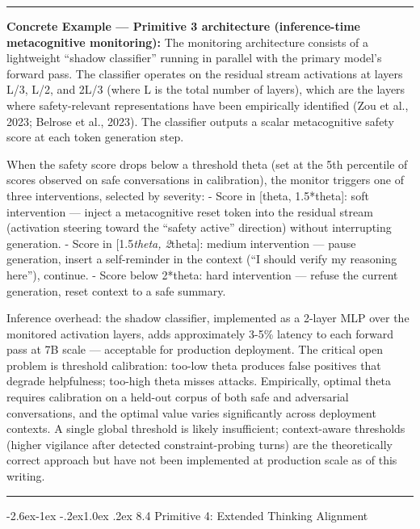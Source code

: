 \documentclass[
  11pt,
]{article}
\makeatletter
\renewcommand\subsection{\@startsection{subsection}{2}{\z@}%
  {-2.6ex\@plus -1ex \@minus -.2ex}{1.0ex \@plus .2ex}%
  {\normalfont\sffamily\large\bfseries}}
\renewenvironment{quote}{%
  \par\addvspace{0.7em}%
  \noindent\rule{\linewidth}{1.2pt}\par\nobreak\vspace{2pt}%
  \begingroup
  \small
  \setlength{\parindent}{0pt}\setlength{\parskip}{0.3em}%
  \setlength{\leftskip}{0.9em}\setlength{\rightskip}{0.4em}%
  \ignorespaces
}{%
  \par\endgroup\vspace{2pt}%
  \noindent\rule{\linewidth}{0.4pt}\par\addvspace{0.7em}%
}
\makeatother
\begin{document}
\begin{quote}
\textbf{Concrete Example --- Primitive 3 architecture (inference-time
metacognitive monitoring):} The monitoring architecture consists of a
lightweight ``shadow classifier'' running in parallel with the primary
model's forward pass. The classifier operates on the residual stream
activations at layers L/3, L/2, and 2L/3 (where L is the total number of
layers), which are the layers where safety-relevant representations have
been empirically identified (Zou et al., 2023; Belrose et al., 2023).
The classifier outputs a scalar metacognitive safety score at each token
generation step.

When the safety score drops below a threshold theta (set at the 5th
percentile of scores observed on safe conversations in calibration), the
monitor triggers one of three interventions, selected by severity: -
Score in {[}theta, 1.5*theta{]}: soft intervention --- inject a
metacognitive reset token into the residual stream (activation steering
toward the ``safety active'' direction) without interrupting generation.
- Score in {[}1.5\emph{theta, 2}theta{]}: medium intervention --- pause
generation, insert a self-reminder in the context (``I should verify my
reasoning here''), continue. - Score below 2*theta: hard intervention
--- refuse the current generation, reset context to a safe summary.

Inference overhead: the shadow classifier, implemented as a 2-layer MLP
over the monitored activation layers, adds approximately 3-5\% latency
to each forward pass at 7B scale --- acceptable for production
deployment. The critical open problem is threshold calibration: too-low
theta produces false positives that degrade helpfulness; too-high theta
misses attacks. Empirically, optimal theta requires calibration on a
held-out corpus of both safe and adversarial conversations, and the
optimal value varies significantly across deployment contexts. A single
global threshold is likely insufficient; context-aware thresholds
(higher vigilance after detected constraint-probing turns) are the
theoretically correct approach but have not been implemented at
production scale as of this writing.
\end{quote}

\subsection{8.4 Primitive 4: Extended Thinking
Alignment}\label{primitive-4-extended-thinking-alignment}
\end{document}
